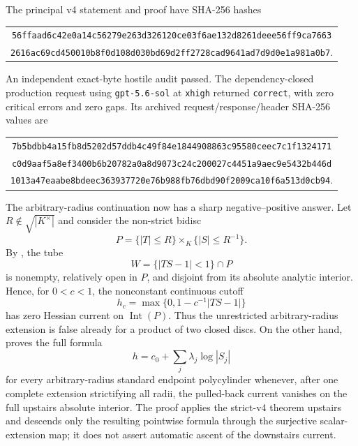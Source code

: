 The principal v4 statement and proof have SHA-256 hashes
\begin{center}
\small
\begin{tabular}{@{}c@{}}
\nolinkurl{56ffaad6c42e0a14c56279e263d326120ce03f6ae132d8261deee56ff9ca7663}\\
\nolinkurl{2616ac69cd450010b8f0d108d030bd69d2ff2728cad9641ad7d9d0e1a981a0b7}.
\end{tabular}
\end{center}
An independent exact-byte hostile audit passed.  The dependency-closed
production request using \texttt{gpt-5.6-sol} at \texttt{xhigh} returned
\texttt{correct}, with zero critical errors and zero gaps.  Its archived
request/response/header SHA-256 values are
\begin{center}
\small
\begin{tabular}{@{}c@{}}
\nolinkurl{7b5bdbb4a15fb8d5202d57ddb4c49f84e1844908863c95580ceec7c1f1324171}\\
\nolinkurl{c0d9aaf5a8ef3400b6b20782a0a8d9073c24c200027c4451a9aec9e5432b446d}\\
\nolinkurl{1013a47eaabe8bdeec363937720e76b988fb76dbd90f2009ca10f6a513d0cb94}.
\end{tabular}
\end{center}

The arbitrary-radius continuation now has a sharp negative--positive answer.
Let \(R\notin\sqrt{|K^\times|}\) and consider the non-strict bidisc
\[
 P=\{|T|\leq R\}\times_K\{|S|\leq R^{-1}\}.
\]
By , the tube
\[
 W=\{|TS-1|<1\}\cap P
\]
is nonempty, relatively open in \(P\), and disjoint from its absolute
analytic interior.  Hence, for \(0<c<1\), the nonconstant continuous cutoff
\[
 h_c=\max\{0,1-c^{-1}|TS-1|\}
\]
has zero Hessian current on \(\operatorname{Int}(P)\).  Thus the
unrestricted arbitrary-radius extension is false already for a product of
two closed discs.  On the other hand,
 proves the full formula
\[
                    h=c_0+\sum_j\lambda_j\log|S_j|
\]
for every arbitrary-radius standard endpoint polycylinder whenever, after
one complete extension strictifying all radii, the pulled-back current
vanishes on the full upstairs absolute interior.  The proof applies the
strict-v4 theorem upstairs and descends only the resulting pointwise formula
through the surjective scalar-extension map; it does not assert automatic
ascent of the downstairs current.

